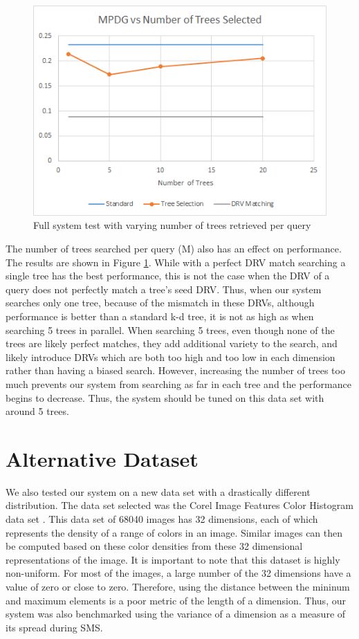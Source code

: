 \begin{figure}[h]
\begin{center}
\includegraphics[width=.85\textwidth]{Figures/treesel}
\end{center}
\caption{Full system test with varying number of trees retrieved per query}
\label{fig:treesel}
\end{figure}

The number of trees searched per query (M) also has an effect on performance.  The results are shown in Figure \ref{fig:treesel}.  While with a perfect DRV match searching a single tree has the best performance, this is not the case when the DRV of a query does not perfectly match a tree's seed DRV.  Thus, when our system searches only one tree, because of the mismatch in these DRVs, although performance is better than a standard k-d tree, it is not as high as when searching 5 trees in parallel.  When searching 5 trees, even though none of the trees are likely perfect matches, they add additional variety to the search, and likely introduce DRVs which are both too high and too low in each dimension rather than having a biased search.  However, increasing the number of trees too much prevents our system from searching as far in each tree and the performance begins to decrease.  Thus, the system should be tuned on this data set with around 5 trees.

\section{Alternative Dataset}

We also tested our system on a new data set with a drastically different distribution.  The data set selected was the Corel Image Features Color Histogram data set \citep{corelimage}. This data set of 68040 images has 32 dimensions, each of which represents the density of a range of colors in an image.  Similar images can then be computed based on these color densities from these 32 dimensional representations of the image.  It is important to note that this dataset is highly non-uniform.  For most of the images, a large number of the 32 dimensions have a value of zero or close to zero.  Therefore, using the distance between the mininum and maximum elements is a poor metric of the length of a dimension.  Thus, our system was also benchmarked using the variance of a dimension as a measure of its spread during SMS.

